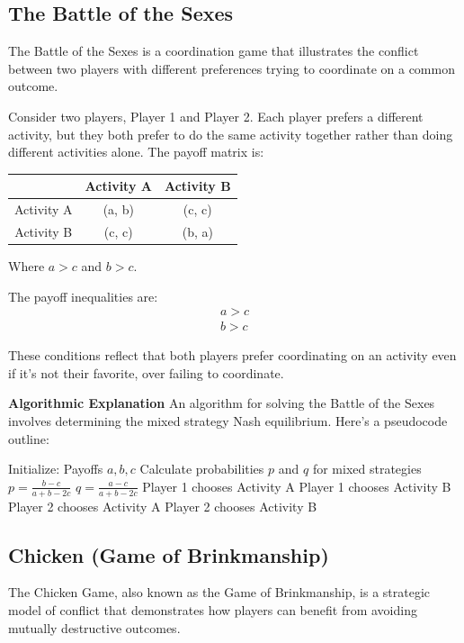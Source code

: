 \documentclass[12pt]{book} %
\begin{document}
\FloatBarrier

\subsection{The Battle of the Sexes}
The Battle of the Sexes is a coordination game that illustrates the conflict between two players with different preferences trying to coordinate on a common outcome.

Consider two players, Player 1 and Player 2. Each player prefers a different activity, but they both prefer to do the same activity together rather than doing different activities alone. The payoff matrix is:

\begin{center}
\begin{tabular}{c|c|c}
 & Activity A & Activity B \\ \hline
Activity A & (a, b) & (c, c) \\ \hline
Activity B & (c, c) & (b, a) \\
\end{tabular}
\end{center}

Where $a > c$ and $b > c$.

The payoff inequalities are:
\begin{align}
a > c \\
b > c
\end{align}

These conditions reflect that both players prefer coordinating on an activity even if it's not their favorite, over failing to coordinate.

\textbf{Algorithmic Explanation}
An algorithm for solving the Battle of the Sexes involves determining the mixed strategy Nash equilibrium. Here's a pseudocode outline:
\FloatBarrier
\begin{algorithm}
\caption{Battle of the Sexes Strategy}
\begin{algorithmic}[1]
\State Initialize: Payoffs $a, b, c$
\State Calculate probabilities $p$ and $q$ for mixed strategies
\State $p = \frac{b-c}{a+b-2c}$
\State $q = \frac{a-c}{a+b-2c}$
    \State Player 1 chooses Activity A
\Else
    \State Player 1 chooses Activity B
\EndIf
{}
    \State Player 2 chooses Activity A
\Else
    \State Player 2 chooses Activity B
\EndIf
\end{algorithmic}
\end{algorithm}
\FloatBarrier

\subsection{Chicken (Game of Brinkmanship)}
The Chicken Game, also known as the Game of Brinkmanship, is a strategic model of conflict that demonstrates how players can benefit from avoiding mutually destructive outcomes.
\end{document}
